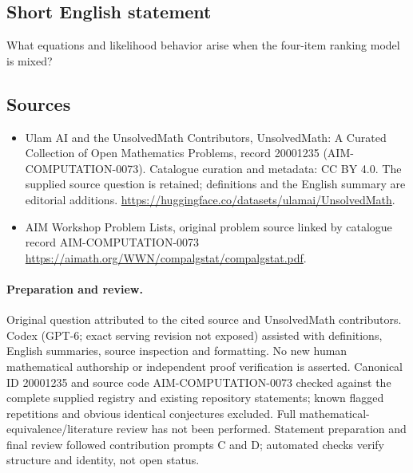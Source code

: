 \documentclass[11pt]{article}
\begin{document}
\subsection{Short English statement}
What equations and likelihood behavior arise when the four-item ranking model is mixed?
\subsection{Sources}
\begin{itemize}
\item[\hypertarget{source:20001235:1}{S1}] Ulam AI and the UnsolvedMath Contributors, UnsolvedMath: A Curated Collection of Open Mathematics Problems, record 20001235 (AIM-COMPUTATION-0073). Catalogue curation and metadata: CC BY 4.0. The supplied source question is retained; definitions and the English summary are editorial additions.
\url{https://huggingface.co/datasets/ulamai/UnsolvedMath}.
\item[\hypertarget{source:20001235:2}{S2}] AIM Workshop Problem Lists, original problem source linked by catalogue record AIM-COMPUTATION-0073
\url{https://aimath.org/WWN/compalgstat/compalgstat.pdf}.
\end{itemize}
\paragraph{Preparation and review.}
Original question attributed to the cited source and UnsolvedMath contributors. Codex (GPT-6; exact serving revision not exposed) assisted with definitions, English summaries, source inspection and formatting. No new human mathematical authorship or independent proof verification is asserted. Canonical ID 20001235 and source code AIM-COMPUTATION-0073 checked against the complete supplied registry and existing repository statements; known flagged repetitions and obvious identical conjectures excluded. Full mathematical-equivalence/literature review has not been performed. Statement preparation and final review followed contribution prompts C and D; automated checks verify structure and identity, not open status.
\label{end:20001235}
\end{document}
